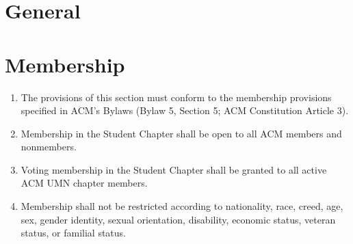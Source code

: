





\section{General}



\section{Membership}
\begin{enumerate}
	\item The provisions of this section must conform to the membership provisions specified in ACM's Bylaws (Bylaw 5, Section 5; ACM Constitution Article 3).
	\item Membership in the Student Chapter shall be open to all ACM members and nonmembers.
	\item Voting membership in the Student Chapter shall be granted to all active ACM UMN chapter members.
	\item Membership shall not be restricted according to nationality, race, creed, age, sex, gender identity, sexual orientation, disability, economic status, veteran status, or familial status.
\end{enumerate}

